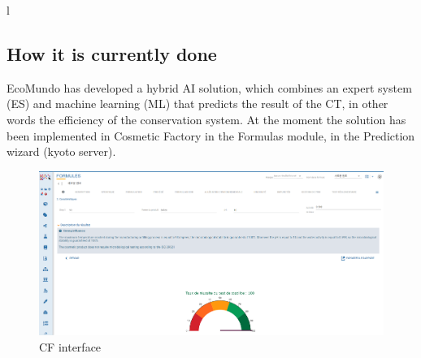 l\documentclass[a4paper,12pt,twoside]{report}
\begin{document}
\subsection{How it is currently done}
EcoMundo has developed a hybrid AI solution, which combines an expert system (ES) and machine learning (ML) that predicts the result of the CT, in other words the efficiency of the conservation system. 
At the moment the solution has been implemented in Cosmetic Factory in the Formulas module, in the Prediction wizard (kyoto server).
\begin{figure}[H]
		\includegraphics[width=\textwidth]{images/kyoto}
	\caption[Cosmetic Factory Interface for CT]{CF interface}
\end{figure}
\end{document}

